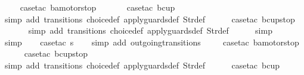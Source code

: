 \begin{isabellebody}
\ \ \ \isamarkupfalse%
\ {\isacharparenleft}case{\isacharunderscore}tac\ {\isachardoublequoteopen}ba{\isacharequal}motorstop\ {}{\isachardoublequoteclose}{\isacharparenright}\isanewline
\ \ \ \ \isamarkupfalse%
\ {\isacharparenleft}case{\isacharunderscore}tac\ {\isachardoublequoteopen}bc{\isacharequal}up{}{}{\isachardoublequoteclose}{\isacharparenright}\isanewline
\ \ \ \ \ \isamarkupfalse%
\ {\isacharparenleft}simp\ add{\isacharcolon}\ transitions\ choice{\isacharunderscore}def\ apply{\isacharunderscore}guards{\isacharunderscore}def\ Str{\isacharunderscore}def{\isacharparenright}\isanewline
\ \ \ \ \isamarkupfalse%
\ {\isacharparenleft}case{\isacharunderscore}tac\ {\isachardoublequoteopen}bc{\isacharequal}up{}{}stop{\isachardoublequoteclose}{\isacharparenright}\isanewline
\ \ \ \ \ \isamarkupfalse%
\ {\isacharparenleft}simp\ add{\isacharcolon}\ transitions\ choice{\isacharunderscore}def\ apply{\isacharunderscore}guards{\isacharunderscore}def\ Str{\isacharunderscore}def{\isacharparenright}\isanewline
\ \ \ \ \isamarkupfalse%
\ simp\isanewline
\ \ \isamarkupfalse%
\ simp\isanewline
\ \ \isamarkupfalse%
\ {\isacharparenleft}case{\isacharunderscore}tac\ {\isachardoublequoteopen}s{\isacharequal}{}{\isachardoublequoteclose}{\isacharparenright}\isanewline
\ \ \isamarkupfalse%
\ {\isacharparenleft}simp\ add{\isacharcolon}\ outgoing{\isacharunderscore}transitions{\isacharunderscore}{}{\isacharparenright}\isanewline
\ \ \ \isamarkupfalse%
\ {\isacharparenleft}case{\isacharunderscore}tac\ {\isachardoublequoteopen}ba{\isacharequal}motorstop{}{\isachardoublequoteclose}{\isacharparenright}\isanewline
\ \ \ \ \isamarkupfalse%
\ {\isacharparenleft}case{\isacharunderscore}tac\ {\isachardoublequoteopen}bc{\isacharequal}up{}{}stop{\isachardoublequoteclose}{\isacharparenright}\isanewline
\ \ \ \ \ \isamarkupfalse%
\ {\isacharparenleft}simp\ add{\isacharcolon}\ transitions\ choice{\isacharunderscore}def\ apply{\isacharunderscore}guards{\isacharunderscore}def\ Str{\isacharunderscore}def{\isacharparenright}\isanewline
\ \ \ \ \isamarkupfalse%
\ {\isacharparenleft}case{\isacharunderscore}tac\ {\isachardoublequoteopen}bc{\isacharequal}up{}{}{\isachardoublequoteclose}{\isacharparenright}\isanewline
\ \ \ \ \ \isamarkupfalse%

\end{isabellebody}
